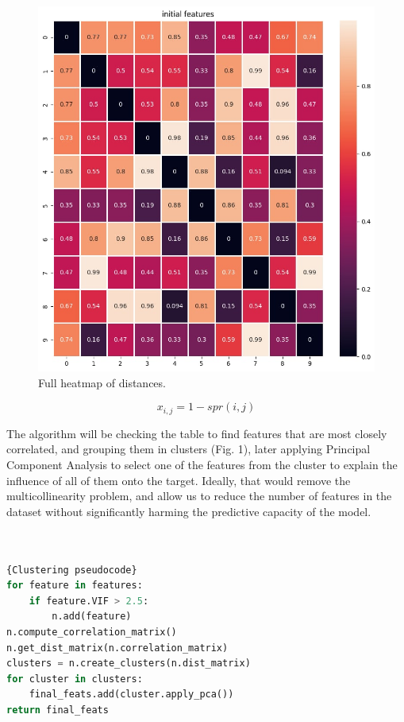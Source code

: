 \documentclass[conference]{IEEEtran}
\begin{document}
\begin{figure}[hbt!]
	\centerline{\includegraphics[scale=0.35]{picture2.jpg}}
	\caption{Full heatmap of distances.}
	\label{fig2}
\end{figure}

\begin{equation}
	x_{i, j}=1-spr(i, j)
\end{equation}

The algorithm will be checking the table to find features that are most closely correlated, and grouping them in clusters (Fig. 1), later applying Principal Component Analysis to select one of the features from the cluster to explain the influence of all of them onto the target. Ideally, that would remove the multicollinearity problem, and allow us to reduce the number of features in the dataset without significantly harming the predictive capacity of the model. \\ \\ \\

\begin{lstlisting}[language=Python]{Clustering pseudocode}
for feature in features:
	if feature.VIF > 2.5:
		n.add(feature)
n.compute_correlation_matrix()
n.get_dist_matrix(n.correlation_matrix)
clusters = n.create_clusters(n.dist_matrix)
for cluster in clusters:
	final_feats.add(cluster.apply_pca())
return final_feats
\end{lstlisting}
\end{document}
